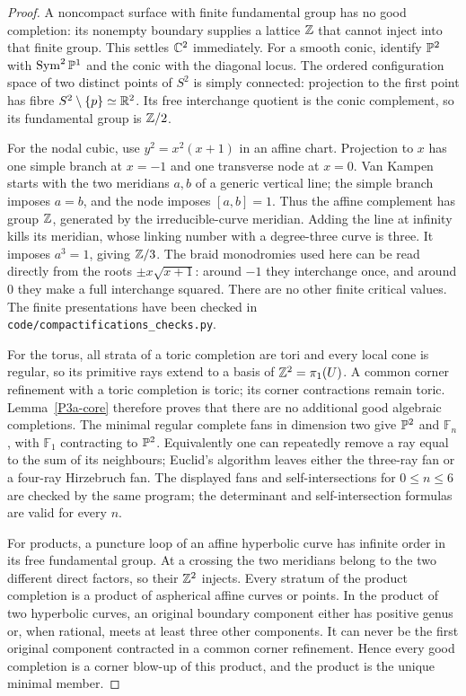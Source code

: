 \begin{proof}
A noncompact surface with finite fundamental group has no good completion:
its nonempty boundary supplies a lattice $\mathbb Z$ that cannot inject into that
finite group.  This settles $\mathbb C^2$ immediately.  For a smooth conic, identify
$\mathbb P^2$ with $\operatorname{Sym}^2\mathbb P^1$ and the conic with the diagonal locus.
The ordered configuration space of two distinct points of $S^2$ is simply
connected: projection to the first point has fibre $S^2\setminus\{p\}\simeq\mathbb R^2$.
Its free interchange quotient is the conic complement, so its fundamental group
is $\mathbb Z/2$.

For the nodal cubic, use $y^2=x^2(x+1)$ in an affine chart.  Projection to $x$
has one simple branch at $x=-1$ and one transverse node at $x=0$.
Van Kampen starts with the two meridians $a,b$ of a generic vertical line;
the simple branch imposes $a=b$, and the node imposes $[a,b]=1$.
Thus the affine complement has group $\mathbb Z$, generated by the irreducible-curve
meridian.  Adding the line at infinity kills its meridian, whose linking number
with a degree-three curve is three.  It imposes $a^3=1$, giving $\mathbb Z/3$.
The braid monodromies used here can be read directly from the roots
$\pm x\sqrt{x+1}$: around $-1$ they interchange once, and around $0$ they make
a full interchange squared.  There are no other finite critical values.
The finite presentations have been checked in
\texttt{code/compactifications\_checks.py}.

For the torus, all strata of a toric completion are tori and every local cone
is regular, so its primitive rays extend to a basis of $\mathbb Z^2=\pi_1(U)$.
A common corner refinement with a toric completion is toric; its corner
contractions remain toric.  Lemma~\ref{P3a-core} therefore proves that there
are no additional good algebraic completions.  The minimal regular complete
fans in dimension two give $\mathbb P^2$ and $\mathbb F_n$, with $\mathbb F_1$
contracting to $\mathbb P^2$.  Equivalently one can repeatedly remove a ray equal
to the sum of its neighbours; Euclid's algorithm leaves either the three-ray
fan or a four-ray Hirzebruch fan.  The displayed fans and self-intersections
for $0\leq n\leq6$ are checked by the same program; the determinant and
self-intersection formulas are valid for every $n$.

For products, a puncture loop of an affine hyperbolic curve has infinite order
in its free fundamental group.  At a crossing the two meridians belong to the
two different direct factors, so their $\mathbb Z^2$ injects.  Every stratum of the
product completion is a product of aspherical affine curves or points.
In the product of two hyperbolic curves, an original boundary component either
has positive genus or, when rational, meets at least three other components.
It can never be the first original component contracted in a common corner
refinement.  Hence every good completion is a corner blow-up of this product,
and the product is the unique minimal member.


\end{proof}
